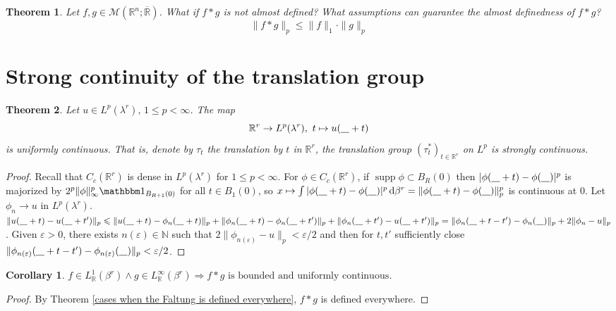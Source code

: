 \documentclass[11pt, a4paper, openany]{book}
\newtheorem{thm}{Theorem}\newtheorem{lem}{Lemma}\newtheorem{crl}{Corollary}
\theoremstyle{definition}
\DeclareMathOperator{\supp}{supp}
\newcommand{\ph}{\underline{\hspace{0.3cm}}}
\begin{document}
    \begin{thm}
        Let $f,g\in\mathcal{M}(\mathbb{R}^n;\overline{\mathbb{R}})$. What if $f*g$ is not almost defined? What assumptions can guarantee the almost definedness of $f*g$?
        \[\|f*g\|_p\leqslant \|f\|_1\cdot \|g\|_p\]
    \end{thm}
\section{Strong continuity of the translation group}
    \begin{thm}\label{continuity of p-norm w.r.t. infinitesimal translation}
        Let $u\in L^p(\lambda^r),\,1\leqslant p<\infty$. The map
        \[\mathbb{R}^r\rightarrow L^p(\lambda^r),\,\, t\mapsto
        u(\ph+t)\]
        is uniformly continuous. That is, denote by $\tau_t$ the translation by $t$ in $\mathbb{R}^r$, the translation group $(\tau_t^*)_{t\in\mathbb{R}^r}$ on $L^p$ is strongly continuous.
    \end{thm}
    \begin{proof}
        Recall that $C_c(\mathbb{R}^r)$ is dense in $L^p(\lambda^r)$ for $1\leqslant p<\infty$. For $\phi\in C_c(\mathbb{R}^r)$, if $\supp \phi\subset B_R(0)$ then $|\phi(\ph+t)-\phi(\ph)|^p$ is majorized by $2^p\|\phi\|_\infty^p\one_{B_{R+1}(0)}$ for all $t\in B_1(0)$, so $x\mapsto \int |\phi(\ph+t)-\phi(\ph)|^p\odif\beta^r=\|\phi(\ph+t)-\phi(\ph)\|_p^p$ is continuous at $0$. Let $\phi_n\to u$ in $L^p(\lambda^r)$. $%
        \|u(\ph+t)-u(\ph+t')\|_p\leqslant \|u(\ph+t)-\phi_n(\ph+t)\|_p+\|\phi_n(\ph+t)-\phi_n(\ph+t')\|_p+\|\phi_n(\ph+t')-u(\ph+t')\|_p=\|\phi_n(\ph+t-t')-\phi_n(\ph)\|_p+2\|\phi_n-u\|_p$. Given $\varepsilon>0$, there exists $n(\varepsilon)\in\mathbb{N}$ such that $2\|\phi_{n(\varepsilon)}-u\|_p<\varepsilon/2$ and then for $t,t'$ sufficiently close $\|\phi_{n(\varepsilon)}(\ph+t-t')-\phi_{n(\varepsilon)}(\ph)\|_p<\varepsilon/2$.
    \end{proof}
    \begin{crl}\label{continuity and boundedness of the Faltung}
        $f\in L^1_\mathbb{R}(\beta^r)\wedge g\in L^\infty_\mathbb{R}(\beta^r)\Longrightarrow f*g\text{ is bounded and uniformly continuous}$.
    \end{crl}
    \begin{proof}
        By Theorem \ref{cases when the Faltung is defined everywhere}, $f*g$ is defined everywhere.
    \end{proof}
\end{document}
